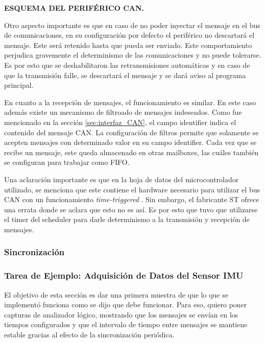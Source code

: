 {\Large \textbf{{\color{red} ESQUEMA DEL PERIFÉRICO CAN.}}}

Otro aspecto importante es que en caso de no poder inyectar el mensaje en el bus de comunicaciones, en su configuración por defecto el periférico no descartará el mensaje. Este será retenido hasta que pueda ser enviado. Este comportamiento perjudica gravemente el determinismo de las comunicaciones y no puede tolerarse. Es por esto que se deshabilitaron las retransmisiones automáticas y en caso de que la transmisión falle, se descartará el mensaje y se dará aviso al programa principal.

En cuanto a la recepción de mensajes, el funcionamiento es similar. En este caso además existe un mecanismo de filtroado de mensajes indeseados. Como fue mencionado en la sección \ref{sec:interfaz_CAN}, el campo identifier indica el contenido del mensaje CAN. La configuración de filtros permite que solamente se acepten mensajes con determinado valor en su campo identifier. Cada vez que se recibe un mensaje, este queda almacenado en otras mailboxes, las cuáles también se configuran para trabajar como FIFO.


Una aclaración importante es que en la hoja de datos del microcontrolador utilizado, se menciona que este contiene el hardware necesario para utilizar el bus CAN con un funcionamiento \textit{time-triggered} \cite[p.~1295]{RM0385}. Sin embargo, el fabricante ST ofrece una errata \cite{STM32F746_errata} donde se aclara que esto no es así. Es por esto que tuvo que utilizarse el timer del scheduler para darle determinismo a la transmisión y recepción de mensajes.

\subsubsection{Sincronización}



\subsubsection{Tarea de Ejemplo: Adquisición de Datos del Sensor IMU}

El objetivo de esta sección es dar una primera muestra de que lo que se implementó funciona como se dijo que debe funcionar. Para eso, quiero poner capturas de analizador lógico, mostrando que los mensajes se envían en los tiempos configurados y que el intervalo de tiempo entre mensajes se mantiene estable gracias al efecto de la sincronización periódica.

